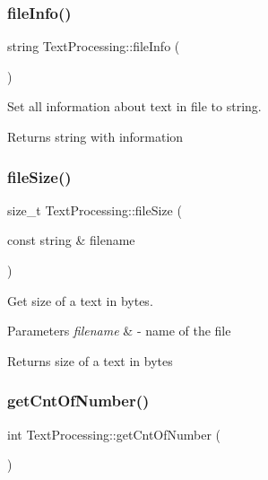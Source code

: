 \subsubsection{\texorpdfstring{file\+Info()}{fileInfo()}}
{\footnotesize\ttfamily string Text\+Processing\+::file\+Info (\begin{DoxyParamCaption}{ }\end{DoxyParamCaption})}



Set all information about text in file to string. 

\begin{DoxyReturn}{Returns}
string with information 
\end{DoxyReturn}
\mbox{\label{class_text_processing_ad1b7ad56f6db82cbb6bc4d62ae926f54}} 
\subsubsection{\texorpdfstring{file\+Size()}{fileSize()}}
{\footnotesize\ttfamily size\+\_\+t Text\+Processing\+::file\+Size (\begin{DoxyParamCaption}\item[{const string \&}]{filename }\end{DoxyParamCaption})}



Get size of a text in bytes. 


\begin{DoxyParams}{Parameters}
{\em filename} & -\/ name of the file \\
\hline
\end{DoxyParams}
\begin{DoxyReturn}{Returns}
size of a text in bytes 
\end{DoxyReturn}
\mbox{\label{class_text_processing_a75a0c64b848a3c262411b925d8402da5}} 
\subsubsection{\texorpdfstring{get\+Cnt\+Of\+Number()}{getCntOfNumber()}}
{\footnotesize\ttfamily int Text\+Processing\+::get\+Cnt\+Of\+Number (\begin{DoxyParamCaption}{ }\end{DoxyParamCaption})}



